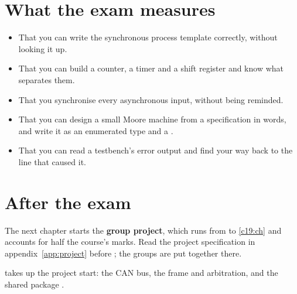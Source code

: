 \section{What the exam measures}
\label{c9:sec:measures}

\begin{itemize}
  \item That you can write the synchronous process template correctly, without looking it up.
  \item That you can build a counter, a timer and a shift register and know what separates them.
  \item That you synchronise every asynchronous input, without being reminded.
  \item That you can design a small Moore machine from a specification in words, and write it as an
    enumerated type and a .
  \item That you can read a testbench's error output and find your way back to the line that caused
    it.
\end{itemize}

\section{After the exam}
\label{c9:sec:after}

The next chapter starts the \textbf{group project}, which runs from  to
\ref{c19:ch} and accounts for half the course's marks. Read the project specification in
appendix~\ref{app:project} before ; the groups are put together there.

 takes up the project start: the CAN bus, the frame and arbitration, and the shared
package .
